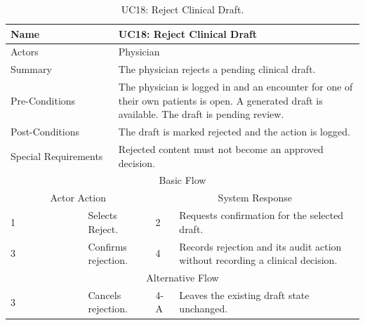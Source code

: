 \begin{table}[htbp]
\centering
\small
\caption{UC18: Reject Clinical Draft.}
\label{tab:kashaf:uc18}
\begin{tabular}{|p{}|p{}|p{}|p{}|p{}|}
\hline
\multicolumn{2}{|p{\dimexpr0.225\textwidth+2\tabcolsep+\arrayrulewidth\relax}|}{Name} & \multicolumn{3}{p{\dimexpr0.575\textwidth+4\tabcolsep+2\arrayrulewidth\relax}|}{UC18: Reject Clinical Draft} \\ \hline
\multicolumn{2}{|p{\dimexpr0.225\textwidth+2\tabcolsep+\arrayrulewidth\relax}|}{Actors} & \multicolumn{3}{p{\dimexpr0.575\textwidth+4\tabcolsep+2\arrayrulewidth\relax}|}{Physician} \\ \hline
\multicolumn{2}{|p{\dimexpr0.225\textwidth+2\tabcolsep+\arrayrulewidth\relax}|}{Summary} & \multicolumn{3}{p{\dimexpr0.575\textwidth+4\tabcolsep+2\arrayrulewidth\relax}|}{The physician rejects a pending clinical draft.} \\ \hline
\multicolumn{2}{|p{\dimexpr0.225\textwidth+2\tabcolsep+\arrayrulewidth\relax}|}{Pre-Conditions} & \multicolumn{3}{p{\dimexpr0.575\textwidth+4\tabcolsep+2\arrayrulewidth\relax}|}{The physician is logged in and an encounter for one of their own patients is open. A generated draft is available. The draft is pending review.} \\ \hline
\multicolumn{2}{|p{\dimexpr0.225\textwidth+2\tabcolsep+\arrayrulewidth\relax}|}{Post-Conditions} & \multicolumn{3}{p{\dimexpr0.575\textwidth+4\tabcolsep+2\arrayrulewidth\relax}|}{The draft is marked rejected and the action is logged.} \\ \hline
\multicolumn{2}{|p{\dimexpr0.225\textwidth+2\tabcolsep+\arrayrulewidth\relax}|}{Special Requirements} & \multicolumn{3}{p{\dimexpr0.575\textwidth+4\tabcolsep+2\arrayrulewidth\relax}|}{Rejected content must not become an approved decision.} \\ \hline
\multicolumn{5}{|c|}{Basic Flow} \\ \hline
\multicolumn{3}{|c|}{Actor Action} & \multicolumn{2}{c|}{System Response} \\ \hline
1 & \multicolumn{2}{p{\dimexpr0.37\textwidth+2\tabcolsep+\arrayrulewidth\relax}|}{Selects Reject.} & 2 & Requests confirmation for the selected draft. \\ \hline
3 & \multicolumn{2}{p{\dimexpr0.37\textwidth+2\tabcolsep+\arrayrulewidth\relax}|}{Confirms rejection.} & 4 & Records rejection and its audit action without recording a clinical decision. \\ \hline
\multicolumn{5}{|c|}{Alternative Flow} \\ \hline
3 & \multicolumn{2}{p{\dimexpr0.37\textwidth+2\tabcolsep+\arrayrulewidth\relax}|}{Cancels rejection.} & 4-A & Leaves the existing draft state unchanged. \\ \hline
\end{tabular}
\end{table}

